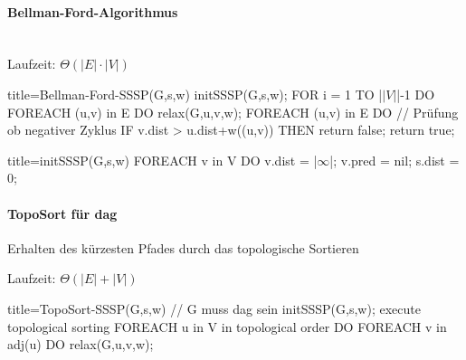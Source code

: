 \documentclass[
    ngerman,
    color=3b,
    dark_mode,
    load_common, %
    summary,
    boxarc,
]{tuda_summary}
\begin{document}
\paragraph{Bellman-Ford-Algorithmus}\mbox{}\\
Laufzeit: $\Theta(|E| \cdot |V|)$
\begin{codeBlock}[autogobble,escapeinside=||]{title={Bellman-Ford-SSSP(G,s,w)}}
    initSSSP(G,s,w);
    FOR i = 1 TO |$\vert V\vert$|-1 DO
        FOREACH (u,v) in E DO
            relax(G,u,v,w);
    FOREACH (u,v) in E DO   // Prüfung ob negativer Zyklus
        IF v.dist > u.dist+w((u,v)) THEN
            return false;
    return true;
\end{codeBlock}
\begin{codeBlock}[autogobble,escapeinside=||]{title={initSSSP(G,s,w)}}
    FOREACH v in V DO
        v.dist = |$\infty$|;
        v.pred = nil;
    s.dist = 0;
\end{codeBlock}
\vspace{-1em}
\paragraph{TopoSort für dag}\mbox{}
\begin{idea}
    Erhalten des kürzesten Pfades durch das topologische Sortieren
\end{idea}
Laufzeit: $\Theta(|E| + |V|)$

\begin{codeBlock}[autogobble]{title={TopoSort-SSSP(G,s,w)    // G muss dag sein}}
    initSSSP(G,s,w);
    execute topological sorting
    FOREACH u in V in topological order DO
        FOREACH v in adj(u) DO
            relax(G,u,v,w);
\end{codeBlock}

\vspace{-1em}
\end{document}
